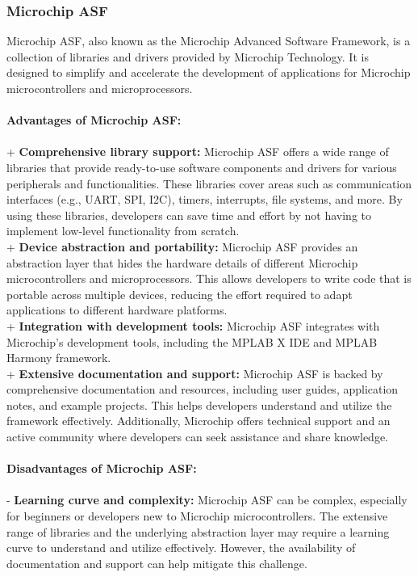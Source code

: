 \subsubsection{Microchip ASF}
Microchip ASF, also known as the Microchip Advanced Software Framework, is a collection of libraries and drivers provided by Microchip Technology. It is designed to simplify and accelerate the development of applications for Microchip microcontrollers and microprocessors. \\\\
\textbf{Advantages of Microchip ASF:} \\\\
+ \textbf{Comprehensive library support:} Microchip ASF offers a wide range of libraries that provide ready-to-use software components and drivers for various peripherals and functionalities. These libraries cover areas such as communication interfaces (e.g., UART, SPI, I2C), timers, interrupts, file systems, and more. By using these libraries, developers can save time and effort by not having to implement low-level functionality from scratch.\\ 
+ \textbf{Device abstraction and portability:} Microchip ASF provides an abstraction layer that hides the hardware details of different Microchip microcontrollers and microprocessors. This allows developers to write code that is portable across multiple devices, reducing the effort required to adapt applications to different hardware platforms. \\
+ \textbf{Integration with development tools:} Microchip ASF integrates with Microchip's development tools, including the MPLAB X IDE and MPLAB Harmony framework. \\
+ \textbf{Extensive documentation and support:} Microchip ASF is backed by comprehensive documentation and resources, including user guides, application notes, and example projects. This helps developers understand and utilize the framework effectively. Additionally, Microchip offers technical support and an active community where developers can seek assistance and share knowledge. \\\\
\textbf{Disadvantages of Microchip ASF:}\\\\
- \textbf{Learning curve and complexity:} Microchip ASF can be complex, especially for beginners or developers new to Microchip microcontrollers. The extensive range of libraries and the underlying abstraction layer may require a learning curve to understand and utilize effectively. However, the availability of documentation and support can help mitigate this challenge. \\
